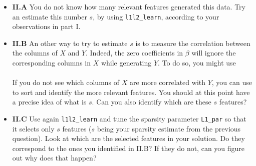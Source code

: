 \documentclass[DIN, pagenumber=false, fontsize=11pt, parskip=half]{scrartcl}
\begin{document}
\begin{itemize}
  \item \textbf{II.A} You do not know how many relevant features generated this data.
  Try an estimate this number $s$, by using \texttt{l1l2\_learn}, according to your observations in part I.

  \item \textbf{II.B} An other way to try to estimate $s$ is to measure the correlation between the columns of $X$ and $Y$.
  Indeed, the zero coefficients in $\beta$ will ignore the corresponding columns in $X$ while generating $Y$.
  To do so, you might use\\
  \\
  If you do not see which columns of $X$ are more correlated with $Y$, you can use  to sort and identify the more relevant features.
You should at this point have a precise idea of what is $s$.
Can you also identify which are these $s$ features?

  \item \textbf{II.C} Use again \texttt{l1l2\_learn} and tune the sparsity parameter \texttt{L1\_par} so that it selects only $s$ features ($s$ being your sparsity estimate from the previous question).
  Look at which are the selected features in your solution.
  Do they correspond to the ones you identified in II.B?
  If they do not, can you figure out why does that happen?\\
\end{itemize}
\end{document}
